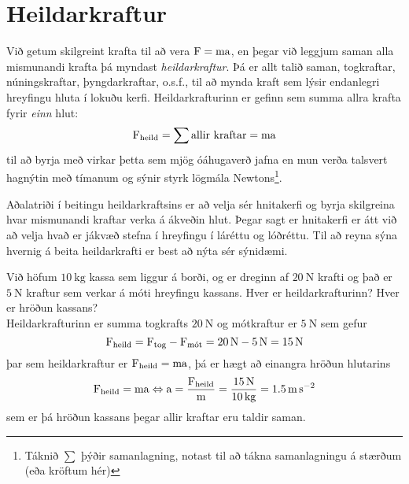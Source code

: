 \section{Heildarkraftur}
Við getum skilgreint krafta til að vera $\textrm{F} = \textrm{m} \textrm{a}$, en
þegar við leggjum saman alla mismunandi krafta þá myndast \emph{heildarkraftur}.
Þá er allt talið saman, togkraftar, núningskraftar, þyngdarkraftar, o.s.f., til
að mynda kraft sem lýsir endanlegri hreyfingu hluta í lokuðu kerfi.
Heildarkrafturinn er gefinn sem summa allra krafta fyrir \emph{einn} hlut:
\begin{equation}
	\textrm{F}_\text{heild} = \sum \text{allir kraftar} = \textrm{m} \textrm{a}
\end{equation}
til að byrja með virkar þetta sem mjög óáhugaverð jafna en mun verða
talsvert hagnýtin með tímanum og sýnir styrk lögmála Newtons\footnote{
Táknið $\sum$ þýðir samanlagning, notast til að tákna
samanlagningu á stærðum (eða kröftum hér) }. 
\begin{center}
\end{center}
Aðalatriði í
beitingu heildarkraftsins er að velja sér hnitakerfi og byrja skilgreina
hvar mismunandi kraftar verka á ákveðin hlut. Þegar sagt er hnitakerfi
er átt við að velja hvað er jákvæð stefna í hreyfingu í láréttu og lóðréttu.
Til að reyna sýna hvernig á beita heildarkrafti er best að nýta sér
sýnidæmi.
\begin{formalexample}
Við höfum $\SI{10}{\kilo\gram}$ kassa sem liggur á borði, og er dreginn af 
$\SI{20}{\newton}$ krafti og það er $\SI{5}{\newton}$ kraftur sem verkar á móti hreyfingu 
kassans. Hver er heildarkrafturinn? Hver er hröðun kassans?
\\[4 ex]
Heildarkrafturinn er summa togkrafts $\SI{20}{\newton}$ og mótkraftur er 
$\SI{5}{\newton}$
sem gefur
\[
	\textrm{F}_\text{heild} = \textrm{F}_\text{tog} - \textrm{F}_\text{mót}
		= \SI{20}{\newton} - \SI{5}{\newton} = \SI{15}{\newton}
\]
þar sem heildarkraftur er $\textrm{F}_\text{heild} = \textrm{m}\textrm{a}$, þá er hægt
að einangra hröðun hlutarins
\[
	\textrm{F}_\text{heild} = \textrm{m}\textrm{a} 
		\Leftrightarrow
		\textrm{a} = \frac{\textrm{F}_\text{heild}}{\textrm{m}}
			= \frac{ \SI{15}{\newton} }{ \SI{10}{\kilo\gram} }
			= \SI{1.5}{ \meter\per\second\squared }
\]
sem er þá hröðun kassans þegar allir kraftar eru taldir saman.
\end{formalexample}

